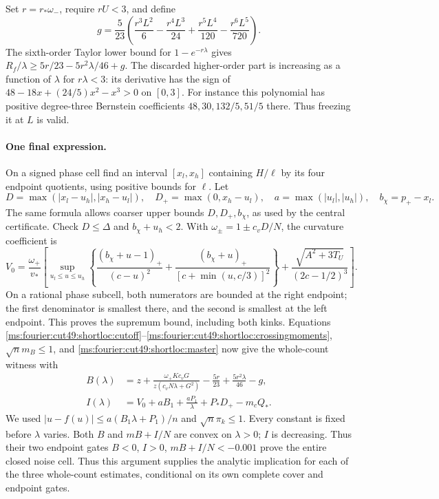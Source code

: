 Set $r=r_*\omega_-$, require $rU<3$, and define
\begin{equation}\label{ms:fourier:cut49:shortloc:gain}
 g=\frac5{23}\left(\frac{r^3L^2}{6}-\frac{r^4L^3}{24}
                     +\frac{r^5L^4}{120}-\frac{r^6L^5}{720}\right).
\end{equation}
The sixth-order Taylor lower bound for $1-e^{-r\lambda}$ gives
$R_f/\lambda\ge5r/23-5r^2\lambda/46+g$. The discarded higher-order
part is increasing as a function of $\lambda$ for $r\lambda<3$:
its derivative has the sign of $48-18x+(24/5)x^2-x^3>0$ on $[0,3]$.
For instance this polynomial has positive degree-three Bernstein
coefficients $48,30,132/5,51/5$ there. Thus freezing it at $L$ is valid.

\paragraph{One final expression.}
On a signed phase cell find an interval $[x_l,x_h]$ containing $H/\ell$
by its four endpoint quotients, using positive bounds for $\ell$.
Let
\[
 D=\max(|x_l-u_h|,|x_h-u_l|),\quad
 D_+=\max(0,x_h-u_l),\quad a=\max(|u_l|,|u_h|),\quad b_\chi=p_+-x_l.
\]
The same formula allows coarser upper bounds $D,D_+,b_\chi$, as used by
the central certificate. Check $D\le\Delta$ and $b_\chi+u_h<2$.
With $\omega_\pm=1\pm c_vD/N$, the curvature coefficient is
\begin{equation}\label{ms:fourier:cut49:shortloc:V}
 V_0=\frac{\omega_+}{v_*}\left[
 \sup_{u_l\le u\le u_h}\left\{
 \frac{(b_\chi+u-1)_+}{(c-u)^2}
 +\frac{(b_\chi+u)_+}{[c+\min(u,c/3)]^2}\right\}
 +\frac{\sqrt{A^2+3T_U}}{(2c-1/2)^3}\right].
\end{equation}
On a rational phase subcell, both numerators are bounded at the right
endpoint; the first denominator is smallest there, and the second is
smallest at the left endpoint. This proves the supremum bound, including
both kinks. Equations \eqref{ms:fourier:cut49:shortloc:cutoff}--\eqref{ms:fourier:cut49:shortloc:crossingmoments},
$\sqrt n m_B\le1$, and \eqref{ms:fourier:cut49:shortloc:master} now give the whole-count
witness with
\begin{align}\label{ms:fourier:cut49:shortloc:BI}
 B(\lambda)&=z+\frac{\omega_+Kc_vG}{z(c_vN\lambda+G^2)}
                      -\frac{5r}{23}+\frac{5r^2\lambda}{46}-g,\\
 I(\lambda)&=V_0+aB_1+\frac{aP_1}{\lambda}+P_*D_+-m_cQ_*.
 \nonumber
\end{align}
We used $|u-f(u)|\le a(B_1\lambda+P_1)/n$ and $\sqrt n\pi_k\le1$.
Every constant is fixed before $\lambda$ varies. Both $B$ and
$mB+I/N$ are convex on $\lambda>0$; $I$ is decreasing. Thus their two
endpoint gates $B<0$, $I>0$, $mB+I/N<-0.001$ prove the entire closed noise
cell. Thus this argument supplies the analytic implication for each of the three
whole-count estimates, conditional on its own complete cover and endpoint gates.


